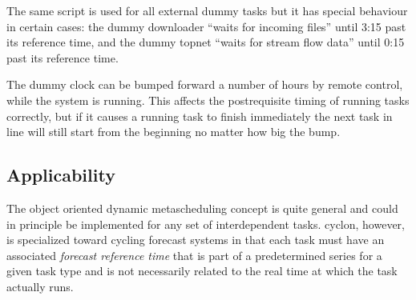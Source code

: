 \documentclass[11pt,a4paper]{article}
\begin{document}
The same script is used for all external dummy tasks but it has special
behaviour in certain cases: the dummy downloader ``waits for incoming
files'' until 3:15 past its reference time, and the dummy topnet ``waits
for stream flow data'' until 0:15 past its reference time.

The dummy clock can be bumped forward a number of hours by remote
control, while the system is running. This affects the postrequisite
timing of running tasks correctly, but if it causes a running task to
finish immediately the next task in line will still start from the
beginning no matter how big the bump.







\subsection{Applicability}

The object oriented dynamic metascheduling concept is quite general and
could in principle be implemented for any set of interdependent tasks.
cyclon, however, is specialized toward cycling forecast systems in that
each task must have an associated {\em forecast reference time} that is
part of a predetermined series for a given task type and is not
necessarily related to the real time at which the task actually runs.  
\end{document}
